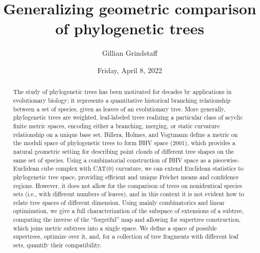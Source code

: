 \documentclass{UAmathtalk}
\author{Gillian Grindstaff}
\title{Generalizing geometric comparison of phylogenetic trees}
\date{Friday, April 8, 2022}
\begin{document}
\maketitle

\begin{abstract}
The study of phylogenetic trees has been motivated for decades by applications in evolutionary biology; it represents a quantitative historical branching relationship between a set of species, given as leaves of an evolutionary tree. More generally, phylogenetic trees are weighted, leaf-labeled trees realizing a particular class of acyclic finite metric spaces, encoding either a branching, merging, or static curvature relationship on a unique base set. Billera, Holmes, and Vogtmann define a metric on the moduli space of phylogenetic trees to form BHV space (2001), which provides a natural geometric setting for describing point clouds of different tree shapes on the same set of species. Using a combinatorial construction of BHV space as a piecewise-Euclidean cube complex with CAT(0) curvature, we can extend Euclidean statistics to phylogenetic tree space, providing efficient and unique Fr\'{e}chet means and confidence regions. However, it does not allow for the comparison of trees on nonidentical species sets (i.e., with different numbers of leaves), and in this context it is not evident how to relate tree spaces of different dimension. Using mainly combinatorics and linear optimization, we give a full characterization of the subspace of extensions of a subtree, computing the inverse of the ``forgetful'' map and allowing for supertree construction, which joins metric subtrees into a single space. We define a space of possible supertrees, optimize over it, and, for a collection of tree fragments with different leaf sets, quantify their compatibility.
\end{abstract}
\end{document}
